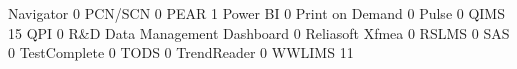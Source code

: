 \documentclass{article}
\begin{document}
\begin{Schunk}
\begin{Soutput}
  Navigator                                                             0
  PCN/SCN                                                               0
  PEAR                                                                  1
  Power BI                                                              0
  Print on Demand                                                       0
  Pulse                                                                 0
  QIMS                                                                 15
  QPI                                                                   0
  R&D Data Management Dashboard                                         0
  Reliasoft Xfmea                                                       0
  RSLMS                                                                 0
  SAS                                                                   0
  TestComplete                                                          0
  TODS                                                                  0
  TrendReader                                                           0
  WWLIMS                                                               11
                                                           

\end{Soutput}
\end{Schunk}
\end{document}
